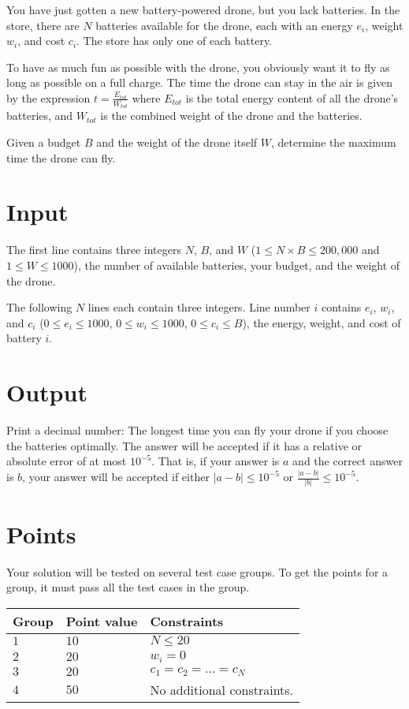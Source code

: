 
You have just gotten a new battery-powered drone, but you lack batteries.
In the store, there are $N$ batteries available for the drone,
each with an energy $e_i$, weight $w_i$, and cost $c_i$.
The store has only one of each battery.

To have as much fun as possible with the drone, you obviously want it to
fly as long as possible on a full charge.
The time the drone can stay in the air is given by the expression $t = \frac{E_{tot}}{W_{tot}}$ where $E_{tot}$
is the total energy content of all the drone's batteries, and $W_{tot}$ is the combined weight of the drone and the batteries.

Given a budget $B$ and the weight of the drone itself $W$, determine
the maximum time the drone can fly.


\section*{Input}
The first line contains three integers $N$, $B$, and $W$ ($1 \leq N \times B \leq 200,000$ and $1 \leq W \leq 1000$),
the number of available batteries, your budget, and the weight of the drone.

The following $N$ lines each contain three integers. Line number $i$ contains $e_i$,
$w_i$, and $c_i$ ($0 \leq e_i \leq 1000$, $0 \leq w_i \leq 1000$, $0 \leq c_i \leq B$), 
the energy, weight, and cost of battery $i$.

\section*{Output}
Print a decimal number: The longest time you can fly your drone if you choose the batteries optimally.
The answer will be accepted if it has a relative or absolute error of at most $10^{-5}$.
That is, if your answer is $a$ and the correct answer is $b$, your answer will be accepted if
either $|a-b| \leq 10^{-5}$ or $\frac{|a-b|}{|b|} \leq 10^{-5}$.

\section*{Points}
Your solution will be tested on several test case groups.
To get the points for a group, it must pass all the test cases in the group.

\noindent
\begin{tabular}{| l | l | p{12cm} |}
  \hline
  \textbf{Group} & \textbf{Point value} & \textbf{Constraints} \\ \hline
  $1$   & $10$       & $N \leq 20$ \\ \hline
  $2$   & $20$       & $w_i = 0$ \\ \hline
  $3$   & $20$       & $c_1 = c_2 = \dots = c_N$ \\ \hline
  $4$   & $50$       & No additional constraints. \\ \hline
\end{tabular}

